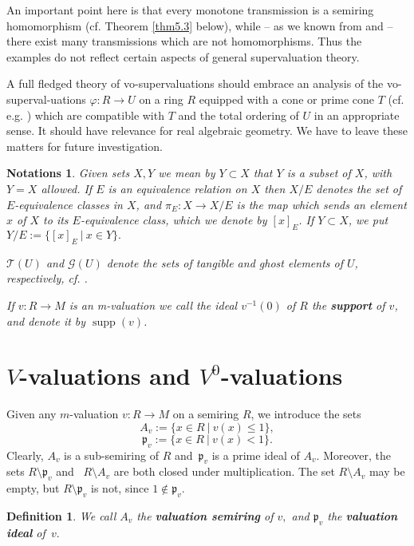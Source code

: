\documentclass [12pt,a4paper,reqno]{amsart}
\newtheorem{defn}[thm]{Definition}
\newtheorem*{notations*} {Notations}
\begin{document}
An important point here is that  every monotone transmission  is a
semiring homomorphism (cf. Theorem \ref{thm5.3} below), while --
as we known from \cite{IKR1}  and \cite{IKR2} -- there exist many
transmissions which are not homomorphisms. Thus the examples do
not reflect certain aspects of general supervaluation theory.

A full fledged  theory of {vo}-supervaluations should embrace an
analysis of the {vo}-superval-uations  ${\varphi}: R \to U$ on a ring
$R$ equipped with  a cone or prime cone $T$ (cf. e.g.
\cite[Definitions~4.2.1, 4.3.1]{BCR}) which are compatible with
$T$ and the total ordering of $U$ in an appropriate sense. It
should have relevance for real algebraic geometry. We have to
leave these matters for future investigation.

\begin{notations*}
Given sets $X,Y$ we mean by $Y \subset X$ that $Y$ is a subset of
$X$, with $Y  = X$ allowed. If $E$ is an equivalence relation on
$X$ then $X/E$ denotes the set of $E$-equivalence classes in $X$,
and $\pi_E: X \to X/E$ is the map which sends an element $x$ of
$X$ to its $E$-equivalence class, which we denote by $[x]_E$. If
$Y \subset X$, we put $Y/E := \{[x]_E  {\ {|} \ } x \in Y\}.$

${\mathcal T}(U)$ and ${\mathcal G}(U)$ denote the sets of tangible and ghost
elements of $U$, respectively, cf. \cite[Terminology 3.7]{IKR1}.

If $v : R \to M $ is an {m}-valuation we call the ideal $v^{-1}(0)$
of $R$ the \textbf{support} of $v$, and denote it by ${\operatorname{supp}}(v)$.
\end{notations*}

\section{$V$-valuations and ${V^0}$-valuations}\label{sec:1}

Given any $m$-valuation $v: R\to M$ on a semiring $R$, we
introduce the sets
$$A_v:=\{x\in R {\ {|} \ }v(x)\le 1\},$$
$${\mathfrak p} _v:=\{x\in R {\ {|} \ }v(x)<1\}.$$
Clearly, $A_v$ is a sub-semiring of $R$ and~${\mathfrak p} _v$ is a prime
ideal of $A_v.$ Moreover, the sets $R\setminus {\mathfrak p} _v$ and~
$R\setminus A_v$ are both closed under multiplication. The set
$R\setminus A_v$ may be empty, but $R\setminus {\mathfrak p} _v$ is not,
since $1\notin {\mathfrak p} _v.$

\begin{defn}\label{defn1.1}
We call $A_v$ the {\textbf{{valuation semiring}}} of $v,$ and ${\mathfrak p}_v$
the {\textbf{{valuation ideal}}} of~$v.$
\end{defn}
\end{document}
